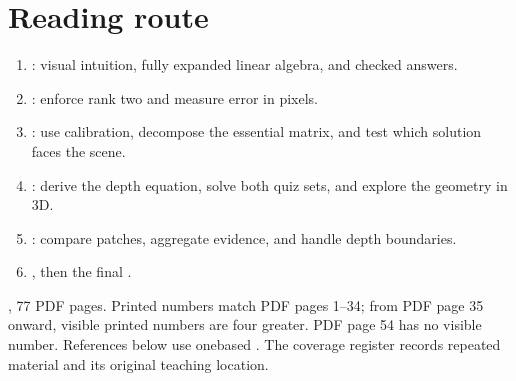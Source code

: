 \documentclass[letterpaper,11pt,english,openany,oneside]{jupyterBook}
\begin{document}
\section{Reading route}
\label{\detokenize{lectures/lecture04/index:reading-route}}\begin{enumerate}
%
\item {}
\sphinxAtStartPar
{\hyperref[\detokenize{lectures/lecture04/epipolar-practice::doc}]{}}: visual intuition, fully expanded linear algebra, and checked answers.

\item {}
\sphinxAtStartPar
{\hyperref[\detokenize{lectures/lecture04/estimation::doc}]{}}: enforce rank two and measure error in pixels.

\item {}
\sphinxAtStartPar
{\hyperref[\detokenize{lectures/lecture04/essential::doc}]{}}: use calibration, decompose the essential matrix, and test which solution faces the scene.

\item {}
\sphinxAtStartPar
{\hyperref[\detokenize{lectures/lecture04/stereo::doc}]{}}: derive the depth equation, solve both quiz sets, and explore the geometry in 3D.

\item {}
\sphinxAtStartPar
{\hyperref[\detokenize{lectures/lecture04/matching::doc}]{}}: compare patches, aggregate evidence, and handle depth boundaries.

\item {}
\sphinxAtStartPar
{\hyperref[\detokenize{lectures/lecture04/review::doc}]{}}, then the final {\hyperref[\detokenize{lectures/lecture04/tldr::doc}]{}}.

\end{enumerate}

\sphinxAtStartPar
{} , 77 PDF pages. Printed numbers match PDF pages 1–34; from PDF page 35 onward, visible printed numbers are four greater. PDF page 54 has no visible number. References below use one\sphinxhyphen{}based . The coverage register records repeated material and its original teaching location.
\end{document}
